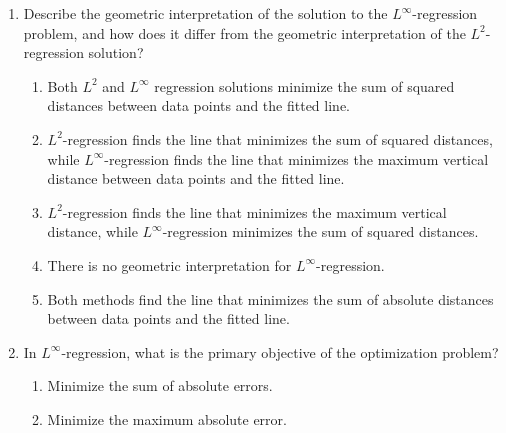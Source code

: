 \documentclass{article}%
\begin{document}
\begin{enumerate}
\begin{enumerate}%
\item $L^\infty$-regression is computationally simpler than $L^2$-regression because it involves only linear equations.%
\item $L^\infty$-regression often requires linear programming techniques, which can be more computationally intensive than the closed-form solution available for $L^2$-regression.%
\item There is no significant computational difference between solving $L^\infty$ and $L^2$ regression problems.%
\item $L^\infty$-regression is always faster because it only considers the maximum error.%
\item $L^2$-regression is computationally more challenging due to the need for iterative methods.%
\end{enumerate}%
\vspace{1em}%
\item Describe the geometric interpretation of the solution to the $L^\infty$-regression problem, and how does it differ from the geometric interpretation of the $L^2$-regression solution?%
\begin{enumerate}%
\item Both $L^2$ and $L^\infty$ regression solutions minimize the sum of squared distances between data points and the fitted line.%
\item $L^2$-regression finds the line that minimizes the sum of squared distances, while $L^\infty$-regression finds the line that minimizes the maximum vertical distance between data points and the fitted line.%
\item $L^2$-regression finds the line that minimizes the maximum vertical distance, while $L^\infty$-regression minimizes the sum of squared distances.%
\item There is no geometric interpretation for $L^\infty$-regression.%
\item Both methods find the line that minimizes the sum of absolute distances between data points and the fitted line.%
\end{enumerate}%
\vspace{1em}%
\item In $L^\infty$-regression, what is the primary objective of the optimization problem?%
\begin{enumerate}%
\item Minimize the sum of absolute errors.%
\item Minimize the maximum absolute error.%

\end{enumerate}
\end{enumerate}
\end{document}
